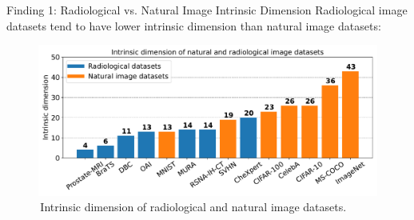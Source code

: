 \documentclass[final,hyperref={pdfpagelabels=false}]{beamer}
\begin{document}
\begin{frame}[t]
\begin{columns}[t]
\begin{column}{.3\textwidth}

\begin{block}{Finding 1: Radiological vs. Natural Image Intrinsic Dimension}
    Radiological image datasets tend to have lower intrinsic dimension than natural image datasets:
    \begin{figure}
        \includegraphics[width=0.95\linewidth]{frompaper/modified/ID.pdf}
        \caption{\,Intrinsic dimension of \textcolor{paperblue}{radiological} and \textcolor{paperorange}{natural} \cite{pope2021intrinsic} image datasets.}
    \end{figure}
\end{block}





\end{column}
\end{columns}
\end{frame}
\end{document}
